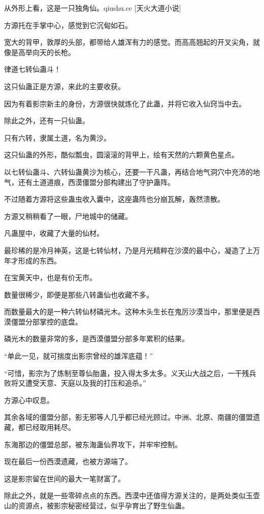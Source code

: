 
\begin{this_body}

从外形上看，这是一只独角仙。qiushu.cc [天火大道小说]

方源托在手掌中心，感觉到它沉甸如石。

宽大的背甲，敦厚的头部，都带给人雄浑有力的感觉。而高高翘起的开叉尖角，就像是高举向天的长枪。

律道七转仙蛊斗！

这只仙蛊正是方源，来此的主要收获。

因为有着影宗新主的身份，方源很快就炼化了此蛊，并将它收入仙窍当中去。

除此之外，还有一只仙蛊。

只有六转，隶属土道，名为黄沙。

这只仙蛊的外形，酷似瓢虫，圆滚滚的背甲上，绘有天然的六颗黄色星点。

以七转仙蛊斗、六转仙蛊黄沙为核心，还要一干凡蛊，再结合地气洞穴中充沛的地气，还有土道道痕，西漠僵盟分部构建出了守护蛊阵。

不过随着方源将这些蛊虫收入囊中，这座蛊阵也分崩瓦解，轰然溃散。

方源又稍稍看了一眼，尸地城中的储藏。

凡蛊屋中，收藏了大量的仙材。

最珍稀的是冷月神英，这是七转仙材，乃是月光精粹在沙漠的最中心，凝造了上万年才形成的东西。

在宝黄天中，也是有价无市。

数量很稀少，即便是那些八转蛊仙也收藏不多。

而数量最大的是一种六转仙材磷光木。这种木头生长在鬼厉沙漠当中，那里便是西漠僵盟分部掌控的底盘。

磷光木的数量非常的多，是西漠僵盟分部多年累积的结果。

“单此一见，就可揣度出影宗曾经的雄浑底蕴！”

“可惜，影宗为了炼制至尊仙胎蛊，投入得太多太多。义天山大战之后，一干残兵败将又遭受天意、天庭以及我的打压和追杀。”

方源心中叹息。

其余各域的僵盟分部，影无邪等人几乎都已经光顾过。中洲、北原、南疆的僵盟遗藏，都已经取用耗尽。

东海那边的僵盟总部，被东海蛊仙界攻下，并牢牢控制。

现在最后一份西漠遗藏，也被方源端了。

这是影宗留在世间的最大一笔财富了。

除此之外，就是一些零碎点点的东西。西漠中还值得方源关注的，是两处类似玉壶山的资源点，被影宗秘密经营过，似乎孕育出了野生仙蛊。


\end{this_body}
